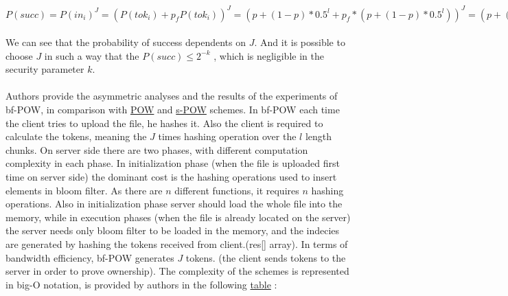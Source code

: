 \documentclass[12pt]{article}
\begin{document}
$P(succ)=P(in_i)^J=(P(tok_i)+p_fP(tok_i))^J=(p+(1-p)*0.5^l + p_f*(p+(1-p)*0.5^l))^J=(p+(1-p)*0.5^l)+p_f(1-p)(1-0.5^l)^J=(p+(1-p)(0.5^l)+p_f(1-0.5^l))^J$\\\\
We can see that the probability   of success dependents on $J$. And it is possible to choose $J$ in such a way that the $P(succ) \leq 2^{-k}$ , which is negligible in the security parameter $k$.\\\\
Authors provide the asymmetric analyses and the results of the experiments of bf-POW, in comparison with \hyperref[sub:Soltuion1]{POW} and \hyperref[sub:Soltuion2]{s-POW} schemes. In bf-POW each time the client tries to upload the file, he hashes it. Also the client is required to calculate the tokens, meaning the $J$ times hashing operation over the $l$ length chunks. On server side there are two phases, with different computation complexity in each phase. In initialization phase (when the file is uploaded first time on server side) the dominant cost is the hashing operations used to insert elements in bloom filter. As there are $n$ different functions, it requires $n$ hashing operations. Also in initialization phase server should load the whole file into the memory, while in execution phases (when the file is already located on the server) the server needs only bloom filter to be loaded in the memory, and the indecies are generated by hashing the tokens received from client.(res[] array). In terms of bandwidth efficiency, bf-POW generates $J$ tokens. (the client sends tokens to the server in order to prove ownership). 
The complexity of the schemes is represented in big-O notation, is provided by authors in the following  \hyperref[table:asymptoticAnalysisBF-POW]{table} : 
\end{document}
